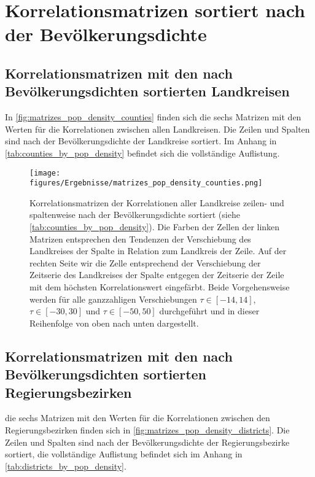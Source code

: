 \section{Korrelationsmatrizen sortiert nach der Bevölkerungsdichte}
\subsection{Korrelationsmatrizen mit den nach Bevölkerungsdichten sortierten Landkreisen}
In \autoref{fig:matrizes_pop_density_counties} finden sich die sechs Matrizen mit den Werten für die Korrelationen zwischen allen Landkreisen. Die Zeilen und Spalten sind nach der Bevölkerungsdichte der Landkreise sortiert. Im Anhang in \autoref{tab:counties_by_pop_density} befindet sich die vollständige Auflistung.

\begin{figure}[H]
    \centering
    \texttt{[image: figures/Ergebnisse/matrizes\_pop\_density\_counties.png]}
    \caption{Korrelationsmatrizen der Korrelationen aller Landkreise zeilen- und spaltenweise nach der Bevölkerungsdichte sortiert (siehe \autoref{tab:counties_by_pop_density}). Die Farben der Zellen der linken Matrizen entsprechen den Tendenzen der Verschiebung des Landkreises der Spalte in Relation zum Landkreis der Zeile.
    Auf der rechten Seite wir die Zelle entsprechend der Verschiebung der Zeitserie des Landkreises der Spalte entgegen der Zeitserie der Zeile mit dem höchsten Korrelationswert eingefärbt. Beide Vorgehensweise werden für alle ganzzahligen Verschiebungen $\tau\in[-14,14]$,  $\tau\in[-30,30]$ und  $\tau\in[-50,50]$ durchgeführt und in dieser Reihenfolge von oben nach unten dargestellt.}
    \label{fig:matrizes_pop_density_counties}
\end{figure}
\subsection{Korrelationsmatrizen mit den nach Bevölkerungsdichten sortierten Regierungsbezirken}
die sechs Matrizen mit den Werten für die Korrelationen zwischen den Regierungsbezirken finden sich in \autoref{fig:matrizes_pop_density_districts}. Die Zeilen und Spalten sind nach der Bevölkerungsdichte der Regierungsbezirke sortiert, die vollständige Auflistung befindet sich im Anhang in \autoref{tab:districts_by_pop_density}.


